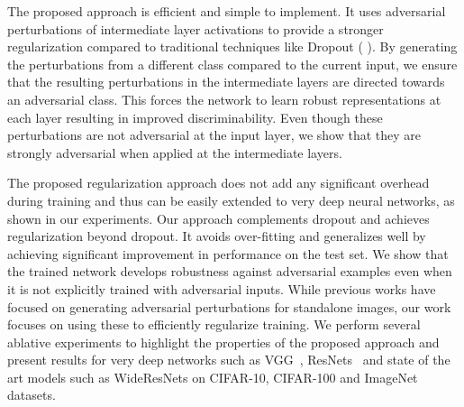 

The proposed approach is efficient and simple to implement. It uses adversarial perturbations of intermediate layer activations to provide a stronger regularization compared to traditional techniques like Dropout (\citeauthor{srivastava2014dropout} \citeyear{srivastava2014dropout}). By generating the perturbations from a different class compared to the current input, we ensure that the resulting perturbations in the intermediate layers are directed towards an adversarial class. This forces the network to learn robust representations at each layer resulting in improved discriminability. Even though these perturbations are not adversarial at the input layer, we show that they are strongly adversarial when applied at the intermediate layers. 

The proposed regularization approach does not add any significant overhead during training and thus can be easily extended to very deep neural networks, as shown in our experiments. Our approach complements dropout and achieves regularization beyond dropout. It avoids over-fitting and generalizes well by achieving significant improvement in performance on the test set. We show that the trained network develops robustness against adversarial examples even when it is not explicitly trained with adversarial inputs. While previous works have focused on generating adversarial perturbations for standalone images, our work focuses on using these to efficiently regularize training. We perform several ablative experiments to highlight the properties of the proposed approach and present results for very deep networks such as VGG~\cite{vgg}, ResNets~\cite{resnet} and state of the art models such as WideResNets \cite{wideresnet} on CIFAR-10, CIFAR-100 and ImageNet datasets.



